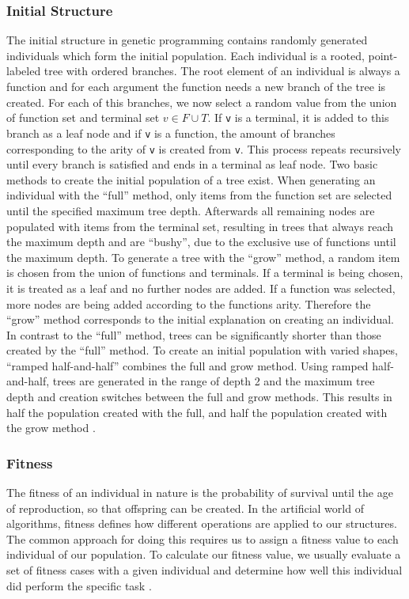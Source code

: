 \documentclass[runningheads]{llncs}
\begin{document}
\subsubsection{Initial Structure}
The initial structure in genetic programming contains randomly generated individuals which form the initial population. Each individual is a rooted, point-labeled tree with ordered branches. The root element of an individual is always a function and for each argument the function needs a new branch of the tree is created. For each of this branches, we now select a random value from the union of function set and terminal set $v \in F \cup T$. If \texttt{v} is a terminal, it is added to this branch as a leaf node and if \texttt{v} is a function, the amount of branches corresponding to the arity of \texttt{v} is created from \texttt{v}. This process repeats recursively until every branch is satisfied and ends in a terminal as leaf node. Two basic methods to create the initial population of a tree exist. When generating an individual with the ``full'' method, only items from the function set are selected until the specified maximum tree depth. Afterwards all remaining nodes are populated with items from the terminal set, resulting in trees that always reach the maximum depth and are ``bushy'', due to the exclusive use of functions until the maximum depth. To generate a tree with the ``grow'' method, a random item is chosen from the union of functions and terminals. If a terminal is being chosen, it is treated as a leaf and no further nodes are added. If a function was selected, more nodes are being added according to the functions arity. Therefore the ``grow'' method corresponds to the initial explanation on creating an individual. In contrast to the ``full'' method, trees can be significantly shorter than those created by the ``full'' method. To create an initial population with varied shapes, ``ramped half-and-half'' combines the full and grow method. Using ramped half-and-half, trees are generated in the range of depth 2 and the maximum tree depth and creation switches between the full and grow methods. This results in half the population created with the full, and half the population created with the grow method \cite[91-93]{gp1-1993}.

\subsubsection{Fitness}
The fitness of an individual in nature is the probability of survival until the age of reproduction, so that offspring can be created. In the artificial world of algorithms, fitness defines how different operations are applied to our structures. The common approach for doing this requires us to assign a fitness value to each individual of our population. To calculate our fitness value, we usually evaluate a set of fitness cases with a given individual and determine how well this individual did perform the specific task \cite[94-95]{gp1-1993}.
\end{document}
